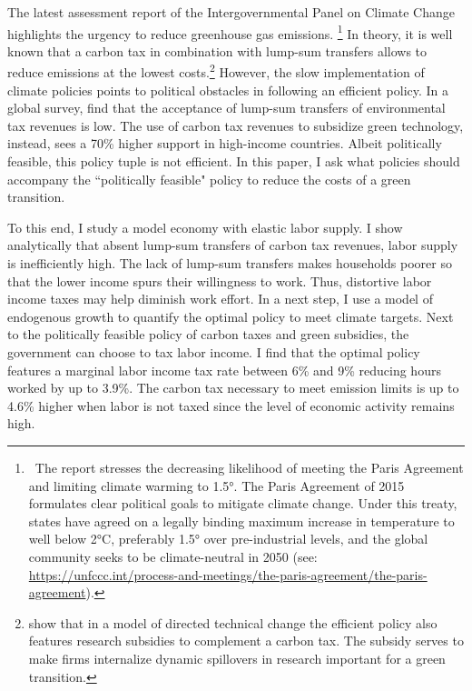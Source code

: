 The latest assessment report of the Intergovernmental Panel on Climate Change \citep{IPCC2022} highlights the urgency to reduce greenhouse gas emissions.%
\footnote{ \  The report stresses the decreasing likelihood of meeting the Paris Agreement and limiting climate warming to 1.5°. The Paris Agreement of 2015 formulates clear political goals to mitigate climate change. Under this treaty, states have agreed on a legally binding maximum increase in temperature to well below 2°C, preferably 1.5° over pre-industrial levels, and the global community seeks to be climate-neutral in 2050  (see: \url{https://unfccc.int/process-and-meetings/the-paris-agreement/the-paris-agreement}). 
} In theory, it is well known that a carbon tax in combination with lump-sum transfers allows to reduce emissions at the lowest costs.\footnote{\cite{Acemoglu2012TheChange} show that  in a model of directed technical change the efficient policy also features research subsidies to complement a carbon tax. The subsidy serves to make firms internalize dynamic spillovers in research important for a green transition.}
 However, the slow implementation of climate policies points to political obstacles in following an efficient policy. In a global survey, \cite{Fabre2023Fighting} find that the acceptance of lump-sum transfers of environmental tax revenues is  low. The use of carbon tax revenues to subsidize green technology, instead, sees a 70\% higher support in high-income countries. Albeit politically feasible, this policy tuple is not efficient. In this paper, I ask what policies should accompany the ``politically feasible" policy to reduce the costs of a green transition. 

To this end, I study a model economy with elastic labor supply. I show analytically that absent lump-sum transfers of carbon tax revenues, labor supply is inefficiently high. The lack of lump-sum transfers makes households poorer so that the lower income spurs their willingness to work. Thus, distortive labor income taxes may help diminish work effort.
In a next step, I use a model of endogenous growth to quantify the optimal policy to meet climate targets. Next to the politically feasible policy of carbon taxes and green subsidies, the government can choose to tax labor income. I find that the optimal policy features a marginal labor income tax rate between 6\% and 9\% reducing hours worked by up to 3.9\%. The carbon tax necessary to meet emission limits is up to 4.6\% higher when labor is not taxed since the level of economic activity remains high.

